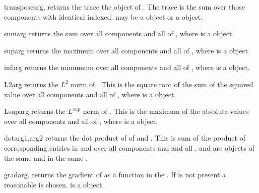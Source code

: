 \begin{funcdesc}{transpose}{arg,}
returns the trace the object of . The trace is the sum over those components
with identical indexed. 
may be a \Data object or a \numarray object.
\end{funcdesc}

\begin{funcdesc}{sum}{arg}
returns the sum over all components and all 
\DataSamplePoints of , where 
is a \Data object. 
\end{funcdesc}

\begin{funcdesc}{sup}{arg}
returns the maximum over all components and all 
\DataSamplePoints of , where 
is a \Data object. 
\end{funcdesc}

\begin{funcdesc}{inf}{arg}
returns the mimumum over all components and all 
\DataSamplePoints of , where 
is a \Data object. 
\end{funcdesc}


\begin{funcdesc}{L2}{arg}
returns the $L^2$ norm of . This is the square root 
of the sum of the squared value over all components and all 
\DataSamplePoints of , where 
is a \Data object. 
\end{funcdesc}

\begin{funcdesc}{Lsup}{arg}
returns the $L^{sup}$ norm of . This is the maximum of the absolute values
 over all components and all 
\DataSamplePoints of , where 
is a \Data object. 
\end{funcdesc}

\begin{funcdesc}{dot}{arg1,arg2}
returns the dot product of of  and . This is sum
of the product of corresponding entries in  and  over all
components and and all 
\DataSamplePoints.  and  are \Data objects of the
same \Shape and in the same \FunctionSpace.
\end{funcdesc}

\begin{funcdesc}{grad}{arg,}
returns the gradient of  as a function in the \FunctionSpace {}.
If  is not present a reasonable \FunctionSpace is chosen.
is a \Data object. 
\end{funcdesc}

